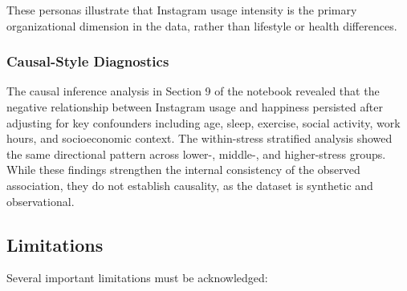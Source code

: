 \documentclass[12pt,a4paper]{article}
\begin{document}
These personas illustrate that Instagram usage intensity is the primary organizational dimension in the data, rather than lifestyle or health differences.
 
\subsubsection{Causal-Style Diagnostics}
 
The causal inference analysis in Section 9 of the notebook revealed that the negative relationship between Instagram usage and happiness persisted after adjusting for key confounders including age, sleep, exercise, social activity, work hours, and socioeconomic context. The within-stress stratified analysis showed the same directional pattern across lower-, middle-, and higher-stress groups. While these findings strengthen the internal consistency of the observed association, they do not establish causality, as the dataset is synthetic and observational.
 

\subsection{Limitations}

Several important limitations must be acknowledged:
 
\end{document}
